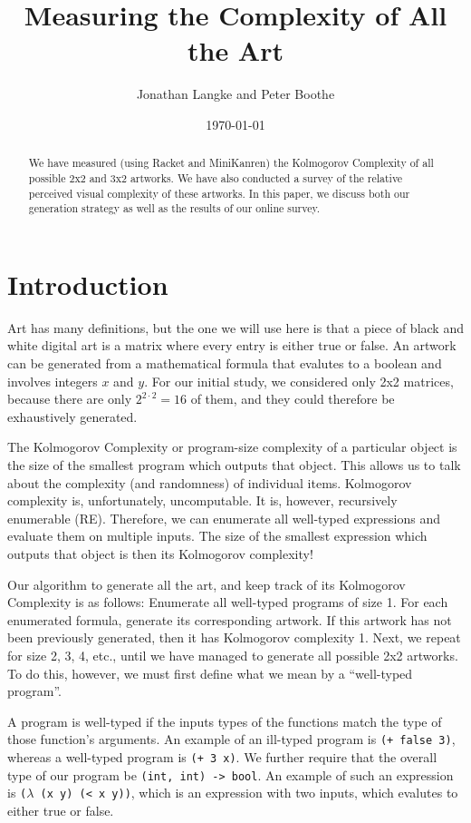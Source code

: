 \documentclass[11pt]{article}
\title{Measuring the Complexity of All the Art}
\author{Jonathan Langke and Peter Boothe}
\date{\today}
\begin{document}
\maketitle

\begin{abstract}
We have measured (using Racket and MiniKanren) the Kolmogorov Complexity of all
possible 2x2 and 3x2 artworks.  We have also conducted a survey of the relative
perceived visual complexity of these artworks.  In this paper, we discuss both
our generation strategy as well as the results of our online survey.
\end{abstract}

\section{Introduction}

Art has many definitions, but the one we will use here is that a piece of black
and white digital art is a matrix where every entry is either true or false.
An artwork can be generated from a mathematical formula that evalutes to a
boolean and involves integers $x$ and $y$.  For our initial study, we
considered only 2x2 matrices, because there are only $2^{2\cdot2} = 16$ of
them, and they could therefore be exhaustively generated.

The Kolmogorov Complexity or program-size complexity of a particular object is
the size of the smallest program which outputs that object.  This allows us to
talk about the complexity (and randomness) of individual items.  Kolmogorov
complexity is, unfortunately, uncomputable.  It is, however, recursively
enumerable (RE).  Therefore, we can enumerate all well-typed expressions and
evaluate them on multiple inputs.  The size of the smallest expression which
outputs that object is then its Kolmogorov complexity!

Our algorithm to generate all the art, and keep track of its Kolmogorov
Complexity is as follows: Enumerate all well-typed programs of size 1.  For
each enumerated formula, generate its corresponding artwork.  If this artwork
has not been previously generated, then it has Kolmogorov complexity 1.  Next,
we repeat for size 2, 3, 4, etc., until we have managed to generate all
possible 2x2 artworks.  To do this, however, we must first define what we mean
by a ``well-typed program''.

A program is well-typed if the inputs types of the functions match the type of those function's arguments.  An example of an ill-typed program is {\tt (+ false 3)}, whereas a well-typed program is {\tt (+ 3 x)}.  We further require that the overall type of our program be {\tt (int, int) -> bool}.  An example of such an expression is {\tt ($\lambda$ (x y) (< x y))}, which is an expression with two inputs, which evalutes to either true or false.
\end{document}
